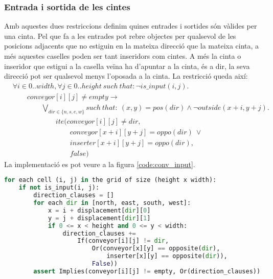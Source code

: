 \subsubsection{Entrada i sortida de les cintes}
Amb aquestes dues restriccions definim quines entrades i sortides són vàlides per una cinta. Pel que fa a les entrades pot rebre objectes per qualsevol de les posicions adjacents que no estiguin en la mateixa direcció que la mateixa cinta, a més aquestes caselles poden ser tant inseridors com cintes. A més la cinta o inseridor que estigui a la casella veïna ha d'apuntar a la cinta, és a dir, la seva direcció pot ser qualsevol menys l'oposada a la cinta. La restricció queda així:
\begin{align*}
    & \forall i \in 0..width, \forall j \in 0..height \ such \ that: \neg is\_input(i, j). \\
    & \qquad conveyor[i][j]\neq empty \rightarrow\\
    & \qquad \qquad \bigvee_{dir \in \{n, s, e, w\}} such \ that: \ (x, y)=pos(dir) \land \neg outside(x+i, y+j).\\
    & \qquad \qquad \qquad ite\Big(conveyor[i][j]\neq dir,\\
    & \qquad \qquad \qquad \qquad conveyor[x+i][y+j]=oppo(dir) \ \lor \\ 
    & \qquad \qquad \qquad \qquad inserter[x+i][y+j]=oppo(dir),\\
    & \qquad \qquad \qquad \qquad false\Big)
\end{align*}
La implementació es pot veure a la figura \ref{code:conv_input}.

\begin{lstlisting}[language=Python, caption=Conveyor Input, label=code:conv_input]
for each cell (i, j) in the grid of size (height x width):
    if not is_input(i, j):
        direction_clauses = []
        for each dir in [north, east, south, west]:
            x = i + displacement[dir][0]
            y = j + displacement[dir][1]
            if 0 <= x < height and 0 <= y < width:
                direction_clauses += 
                    If(conveyor[i][j] != dir,
                        Or(conveyor[x][y] == opposite(dir),
                            inserter[x][y] == opposite(dir)),
                        False))
        assert Implies(conveyor[i][j] != empty, Or(direction_clauses))
\end{lstlisting}


